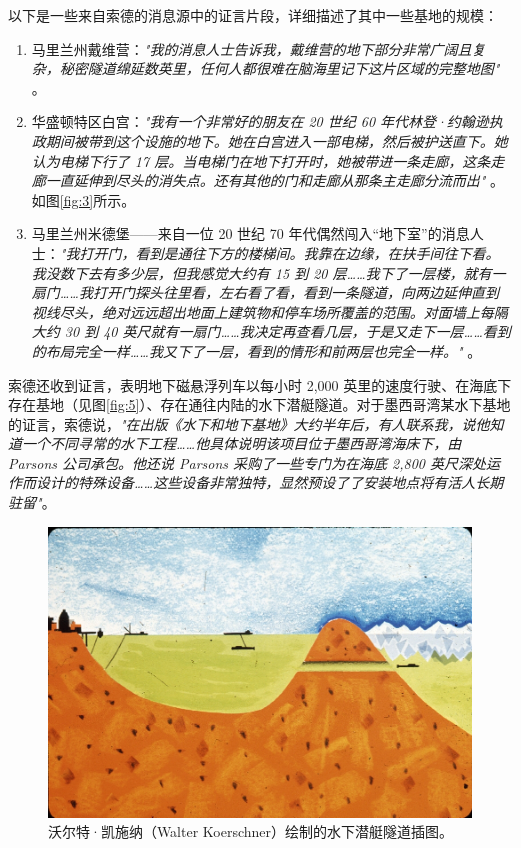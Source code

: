 \documentclass[10pt,twocolumn,letterpaper]{article}
\begin{document}
以下是一些来自索德的消息源中的证言片段，详细描述了其中一些基地的规模：

\begin{flushleft}
\begin{enumerate}
    \item 马里兰州戴维营：\textit{"我的消息人士告诉我，戴维营的地下部分非常广阔且复杂，秘密隧道绵延数英里，任何人都很难在脑海里记下这片区域的完整地图"} \cite{22}。
    \item 华盛顿特区白宫：\textit{"我有一个非常好的朋友在 20 世纪 60 年代林登·约翰逊执政期间被带到这个设施的地下。她在白宫进入一部电梯，然后被护送直下。她认为电梯下行了 17 层。当电梯门在地下打开时，她被带进一条走廊，这条走廊一直延伸到尽头的消失点。还有其他的门和走廊从那条主走廊分流而出"} \cite{22}。如图\ref{fig:3}所示。
    \item 马里兰州米德堡——来自一位 20 世纪 70 年代偶然闯入“地下室”的消息人士：\textit{"我打开门，看到是通往下方的楼梯间。我靠在边缘，在扶手间往下看。我没数下去有多少层，但我感觉大约有 15 到 20 层……我下了一层楼，就有一扇门……我打开门探头往里看，左右看了看，看到一条隧道，向两边延伸直到视线尽头，绝对远远超出地面上建筑物和停车场所覆盖的范围。对面墙上每隔大约 30 到 40 英尺就有一扇门……我决定再查看几层，于是又走下一层……看到的布局完全一样……我又下了一层，看到的情形和前两层也完全一样。"} \cite{22}。
\end{enumerate}
\end{flushleft}

索德还收到证言，表明地下磁悬浮列车以每小时 2,000 英里的速度行驶、在海底下存在基地（见图\ref{fig:5}）、存在通往内陆的水下潜艇隧道。对于墨西哥湾某水下基地的证言，索德说，\textit{"在出版《水下和地下基地》大约半年后，有人联系我，说他知道一个不同寻常的水下工程……他具体说明该项目位于墨西哥湾海床下，由 Parsons 公司承包。他还说 Parsons 采购了一些专门为在海底 2,800 英尺深处运作而设计的特殊设备……这些设备非常独特，显然预设了了安装地点将有活人长期驻留"}\cite{22}。

\begin{figure}[t]
\begin{center}
   \includegraphics[width=1\linewidth]{sub.jpg}
\end{center}
   \caption{沃尔特·凯施纳（Walter Koerschner）绘制的水下潜艇隧道插图\cite{22,23}。}
\label{fig:6}
\label{fig:onecol}
\end{figure}
\end{document}
